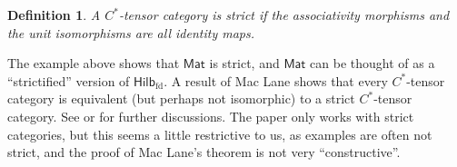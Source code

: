 \documentclass[a4paper,11pt]{article}
\theoremstyle{plain}
\newtheorem{definition}[proposition]{Definition}
\theoremstyle{remark}
\newcommand{\catHilbFD}{\textsf{Hilb}_{\text{fd}}}
\newcommand{\catMat}{\textsf{Mat}}
\begin{document}
\begin{definition}
A $C^*$-tensor category is \emph{strict} if the associativity morphisms and the unit isomorphisms are all identity maps.
\end{definition}

The example above shows that $\catMat$ is strict, and $\catMat$ can be thought of as a ``strictified'' version of $\catHilbFD$.  A result of Mac Lane shows that every $C^*$-tensor category is equivalent (but perhaps not isomorphic) to a strict $C^*$-tensor category.  See \cite[page~38]{NT_CQGsBook} or \cite[Section~2.8]{EGNO_TensorCategories} for further discussions.  The paper \cite{LR_Theory_dimension} only works with strict categories, but this seems a little restrictive to us, as examples are often not strict, and the proof of Mac Lane's theorem is not very ``constructive''.
\end{document}
